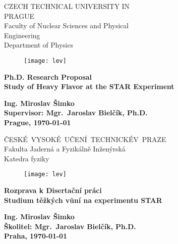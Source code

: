 \documentclass[a4paper,titlepage,11pt]{book} %
\newcommand{\myself}{Ing. Miroslav Šimko}
\newcommand{\engtitle}{Study of Heavy Flavor at the STAR Experiment}
\newcommand{\czechtitle}{Studium těžkých vůní na experimentu STAR}
\newcommand{\skolitel}{Mgr.\ Jaroslav Bielčík, Ph.D.}
\begin{document}
\thispagestyle{empty}
\setcounter{page}{1}
\begin{center}
    {\LARGE \textsc CZECH TECHNICAL UNIVERSITY IN \\[0.3cm]PRAGUE}\\[2ex]
    {\LARGE \textsc Faculty of Nuclear Sciences and Physical \\[0.2cm]Engineering}\\[2ex]
    {\LARGE \textsc Department of Physics}\\
    \vspace{1cm}
    \begin{figure}[ht!]
    \begin{center}
      {\texttt{[image: lev]}}
    \end{center}
    \end{figure}
    \vspace{1cm}

    {\textbf {\Huge Ph.D. Research Proposal \\[4ex]}
    {\LARGE \bf \engtitle} 
    }

    \vfill

    {\Large \bf \myself }\\ [4ex]
    {\large \bf  Supervisor: \skolitel}\\[4ex]
    {\Large \bf Prague, \justyear\today}\\
    \newpage \rule{0pt}{2cm}
\end{center}
\thispagestyle{empty}
\begin{center}
    {\LARGE \textsc \mbox{\v{C}ESK\' E VYSOKÉ U\v CEN\' I TECHNICK\' E \\[0.3cm]V PRAZE}}\\[2ex]
    {\LARGE \textsc Fakulta Jadern\' a a Fyzik\' aln\v e In\v zen\' yrsk\' a}\\[2ex]
    {\LARGE \textsc Katedra fyziky}\\
    \vspace{1cm}
    \begin{figure}[ht!]
    \begin{center}
      {\texttt{[image: lev]}}
    \end{center}
    \end{figure}
    \vspace{1cm}

    {\textbf {\Huge Rozprava k Diserta\v cn\' i pr\' aci \\[4ex]}
    {\LARGE \bf \czechtitle} 
    }

    \vfill

    {\Large \bf \myself }\\ [4ex]
    {\large \bf Školitel: \skolitel}\\[4ex]
    {\Large \bf Praha, \justyear\today}\\
    \newpage \rule{0pt}{2cm}
\end{center}
\end{document}
